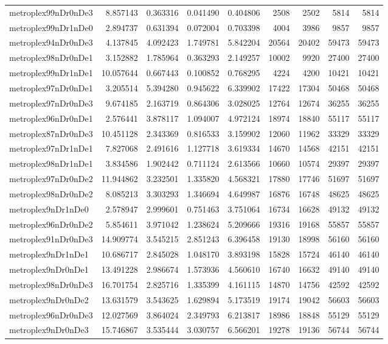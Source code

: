 \begin{longtable}{|l|r|r|r|r|r|r|r|r|}
metroplex99nDr0nDe3 & 8.857143 & 0.363316 & 0.041490 & 0.404806 & 2508 & 2502 & 5814 & 5814 \\
metroplex99nDr1nDe0 & 2.894737 & 0.631394 & 0.072004 & 0.703398 & 4004 & 3986 & 9857 & 9857 \\
metroplex94nDr0nDe3 & 4.137845 & 4.092423 & 1.749781 & 5.842204 & 20564 & 20402 & 59473 & 59473 \\
metroplex98nDr0nDe1 & 3.152882 & 1.785964 & 0.363293 & 2.149257 & 10002 & 9920 & 27400 & 27400 \\
metroplex99nDr1nDe1 & 10.057644 & 0.667443 & 0.100852 & 0.768295 & 4224 & 4200 & 10421 & 10421 \\
metroplex97nDr0nDe1 & 3.205514 & 5.394280 & 0.945622 & 6.339902 & 17422 & 17304 & 50468 & 50468 \\
metroplex97nDr0nDe3 & 9.674185 & 2.163719 & 0.864306 & 3.028025 & 12764 & 12674 & 36255 & 36255 \\
metroplex96nDr0nDe1 & 2.576441 & 3.878117 & 1.094007 & 4.972124 & 18974 & 18840 & 55117 & 55117 \\
metroplex87nDr0nDe3 & 10.451128 & 2.343369 & 0.816533 & 3.159902 & 12060 & 11962 & 33329 & 33329 \\
metroplex97nDr1nDe1 & 7.827068 & 2.491616 & 1.127718 & 3.619334 & 14670 & 14568 & 42151 & 42151 \\
metroplex98nDr1nDe1 & 3.834586 & 1.902442 & 0.711124 & 2.613566 & 10660 & 10574 & 29397 & 29397 \\
metroplex97nDr0nDe2 & 11.944862 & 3.232501 & 1.335820 & 4.568321 & 17880 & 17746 & 51697 & 51697 \\
metroplex98nDr0nDe2 & 8.085213 & 3.303293 & 1.346694 & 4.649987 & 16876 & 16748 & 48625 & 48625 \\
metroplex9nDr1nDe0 & 2.578947 & 2.999601 & 0.751463 & 3.751064 & 16734 & 16628 & 49132 & 49132 \\
metroplex96nDr0nDe2 & 5.854611 & 3.971042 & 1.238624 & 5.209666 & 19316 & 19168 & 55857 & 55857 \\
metroplex91nDr0nDe3 & 14.909774 & 3.545215 & 2.851243 & 6.396458 & 19130 & 18998 & 56160 & 56160 \\
metroplex9nDr1nDe1 & 10.686717 & 2.845028 & 1.048170 & 3.893198 & 15828 & 15724 & 46140 & 46140 \\
metroplex9nDr0nDe1 & 13.491228 & 2.986674 & 1.573936 & 4.560610 & 16740 & 16632 & 49140 & 49140 \\
metroplex98nDr0nDe3 & 16.701754 & 2.825716 & 1.335399 & 4.161115 & 14870 & 14756 & 42592 & 42592 \\
metroplex9nDr0nDe2 & 13.631579 & 3.543625 & 1.629894 & 5.173519 & 19174 & 19042 & 56603 & 56603 \\
metroplex96nDr0nDe3 & 12.027569 & 3.864024 & 2.349793 & 6.213817 & 18986 & 18848 & 55129 & 55129 \\
metroplex9nDr0nDe3 & 15.746867 & 3.535444 & 3.030757 & 6.566201 & 19278 & 19136 & 56744 & 56744 \\
\end{longtable}
